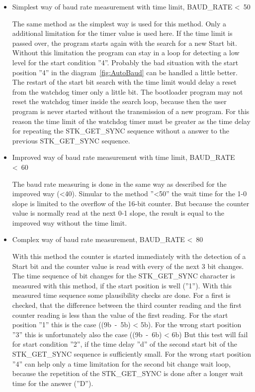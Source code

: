 \begin{itemize}
\item {Simplest way of baud rate measurement with time limit, BAUD\_RATE \textless~50}

The same method as the simplest way is used for this method.
Only a additional limitation for the timer value is used here.
If the time limit is passed over, the program starts again with the search
for a new Start bit.
Without this limitation the program can stay in a loop for detecting
a low level for the start condition ''4''. 
Probably the bad situation with the start position ''4'' in the 
diagram~\ref{fig:AutoBaud} can be handled a little better. 
The restart of the start bit search with the time limit would
delay a reset from the watchdog timer only a little bit.
The bootloader program may not reset the watchdog timer inside
the search loop, because then the user program is never started
without the transmission of a new program.
For this reason the time limit of the watchdog timer must be greater
as the time delay for repeating the STK\_GET\_SYNC sequence
without a answer to the previous STK\_GET\_SYNC sequence.

\item {Improved way of baud rate measurement with time limit, BAUD\_RATE \textless~60}

The baud rate measuring is done in the same way as described for the
improved way (\textless 40).
Simular to the method ''\textless 50'' the wait time for the 1-0 slope
is limited to the overflow of the 16-bit counter.
But because the counter value is normally read at the next 0-1 slope,
the result is equal to the improved way without the time limit.


\item {Complex way of baud rate measurement, BAUD\_RATE \textless~80}

With this method the counter is started immediately with the detection
of a Start bit and the counter value is read with every of the
next 3 bit changes.
The time sequence of bit changes for the STK\_GET\_SYNC character is 
measured with this method, if the start position is well (''1'').
With this measured time sequence some plausibility checks are done.
For a first is checked, that the difference between the third counter
reading and the first counter reading is less than the value
of the first reading.
For the start position ''1'' this is the case ((9b~-~5b) < 5b).
For the wrong start position ''3'' this is unfortunately also the case ((9b~-~6b) < 6b)
But this test will fail for start condition ''2'', if the time delay ''d'' of
the second start bit of the STK\_GET\_SYNC sequence is sufficiently small.
For the wrong start position ''4'' can help only a time limitation for
the second bit change wait loop, because the repetition of the STK\_GET\_SYNC
is done after a longer wait time for the answer (''D''). 


\end{itemize}
